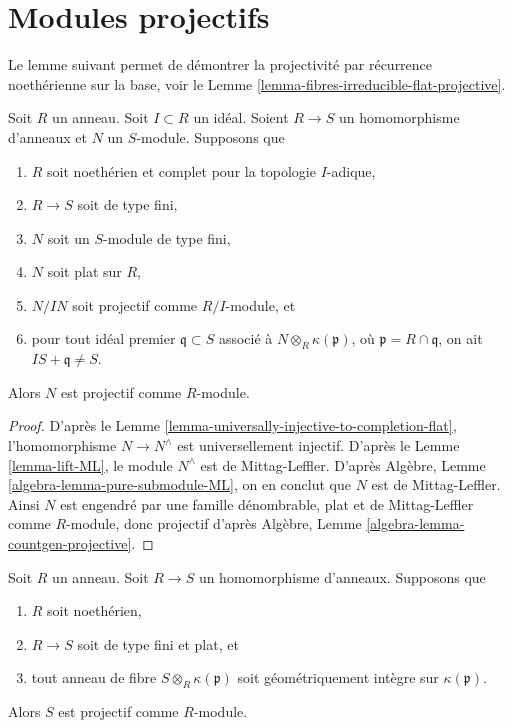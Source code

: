 \section{Modules projectifs}
\label{section-projective}

\noindent
Le lemme suivant permet de démontrer la projectivité par
récurrence noethérienne sur la base, voir
le Lemme \ref{lemma-fibres-irreducible-flat-projective}.

\begin{lemma}
\label{lemma-flat-pure-over-complete-projective}
Soit $R$ un anneau.
Soit $I \subset R$ un idéal.
Soient $R \to S$ un homomorphisme d'anneaux et $N$ un $S$-module.
Supposons que
\begin{enumerate}
\item $R$ soit noethérien et complet pour la topologie $I$-adique,
\item $R \to S$ soit de type fini,
\item $N$ soit un $S$-module de type fini,
\item $N$ soit plat sur $R$,
\item $N/IN$ soit projectif comme $R/I$-module, et
\item pour tout idéal premier $\mathfrak q \subset S$ associé à
$N \otimes_R \kappa(\mathfrak p)$, où $\mathfrak p = R \cap \mathfrak q$,
on ait $IS + \mathfrak q \not = S$.
\end{enumerate}
Alors $N$ est projectif comme $R$-module.
\end{lemma}

\begin{proof}
D'après le
Lemme \ref{lemma-universally-injective-to-completion-flat},
l'homomorphisme $N \to N^\wedge$ est universellement injectif.
D'après le
Lemme \ref{lemma-lift-ML},
le module $N^\wedge$ est de Mittag-Leffler.
D'après
Algèbre, Lemme \ref{algebra-lemma-pure-submodule-ML},
on en conclut que $N$ est de Mittag-Leffler.
Ainsi $N$ est engendré par une famille dénombrable, plat et de Mittag-Leffler comme $R$-module,
donc projectif d'après
Algèbre, Lemme \ref{algebra-lemma-countgen-projective}.
\end{proof}

\begin{lemma}
\label{lemma-fibres-irreducible-flat-projective}
Soit $R$ un anneau.
Soit $R \to S$ un homomorphisme d'anneaux.
Supposons que
\begin{enumerate}
\item $R$ soit noethérien,
\item $R \to S$ soit de type fini et plat, et
\item tout anneau de fibre $S \otimes_R \kappa(\mathfrak p)$ soit
géométriquement intègre sur $\kappa(\mathfrak p)$.
\end{enumerate}
Alors $S$ est projectif comme $R$-module.
\end{lemma}

